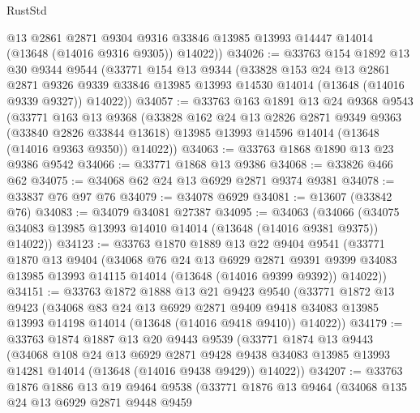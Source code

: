 \begin{lexlean}{RustStd}
\begin{coremodule}
        @13
        @2861
        @2871
        @9304
        @9316
        @33846
        @13985
        @13993
        @14447
        @14014
        (@13648 (@14016 @9316 @9305))
        @14022))
@34026 := @33763
    @154
    @1892
    @13
    @30
    @9344
    @9544
    (@33771
      @154
      @13
      @9344
      (@33828
        @153
        @24
        @13
        @2861
        @2871
        @9326
        @9339
        @33846
        @13985
        @13993
        @14530
        @14014
        (@13648 (@14016 @9339 @9327))
        @14022))
@34057 := @33763
    @163
    @1891
    @13
    @24
    @9368
    @9543
    (@33771
      @163
      @13
      @9368
      (@33828
        @162
        @24
        @13
        @2826
        @2871
        @9349
        @9363
        (@33840 @2826 @33844 @13618)
        @13985
        @13993
        @14596
        @14014
        (@13648 (@14016 @9363 @9350))
        @14022))
@34063 := @33763 @1868 @1890 @13 @23 @9386 @9542
@34066 := @33771 @1868 @13 @9386
@34068 := @33826 @466 @62
@34075 := @34068 @62 @24 @13 @6929 @2871 @9374 @9381
@34078 := @33837 @76 @97 @76
@34079 := @34078 @6929
@34081 := @13607 (@33842 @76)
@34083 := @34079 @34081 @27387
@34095 := @34063
    (@34066 (@34075 @34083 @13985 @13993 @14010 @14014 (@13648 (@14016 @9381 @9375)) @14022))
@34123 := @33763
    @1870
    @1889
    @13
    @22
    @9404
    @9541
    (@33771
      @1870
      @13
      @9404
      (@34068
        @76
        @24
        @13
        @6929
        @2871
        @9391
        @9399
        @34083
        @13985
        @13993
        @14115
        @14014
        (@13648 (@14016 @9399 @9392))
        @14022))
@34151 := @33763
    @1872
    @1888
    @13
    @21
    @9423
    @9540
    (@33771
      @1872
      @13
      @9423
      (@34068
        @83
        @24
        @13
        @6929
        @2871
        @9409
        @9418
        @34083
        @13985
        @13993
        @14198
        @14014
        (@13648 (@14016 @9418 @9410))
        @14022))
@34179 := @33763
    @1874
    @1887
    @13
    @20
    @9443
    @9539
    (@33771
      @1874
      @13
      @9443
      (@34068
        @108
        @24
        @13
        @6929
        @2871
        @9428
        @9438
        @34083
        @13985
        @13993
        @14281
        @14014
        (@13648 (@14016 @9438 @9429))
        @14022))
@34207 := @33763
    @1876
    @1886
    @13
    @19
    @9464
    @9538
    (@33771
      @1876
      @13
      @9464
      (@34068
        @135
        @24
        @13
        @6929
        @2871
        @9448
        @9459

\end{coremodule}
\end{lexlean}
